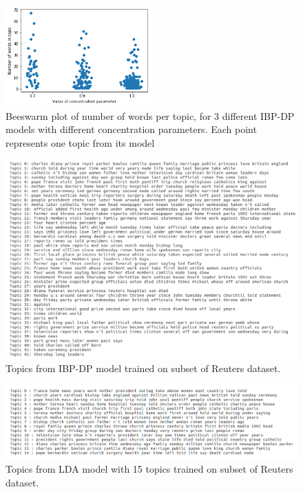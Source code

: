 \documentclass{article}
\begin{document}
\begin{figure}
    \centering
    \includegraphics[width=0.5\textwidth]{figs/ibp_words_in_topic}
    \caption{Beeswarm plot of number of words per topic, for 3 different IBP-DP models with different concentration parameters. Each point represents one topic from its model}
    \label{fig:ibp_words_in_topic}
\end{figure}

\begin{figure}
    \centering
    \includegraphics[width=1\textwidth]{figs/ibptopics}
    \caption{Topics from IBP-DP model trained on subset of Reuters dataset.}
    \label{fig:ibptopics}
\end{figure}

\begin{figure}
    \centering
    \includegraphics[width=1\textwidth]{figs/ldatopics}
    \caption{Topics from LDA model with 15 topics trained on subset of Reuters dataset.}
    \label{fig:ldatopics}
\end{figure}
\end{document}
